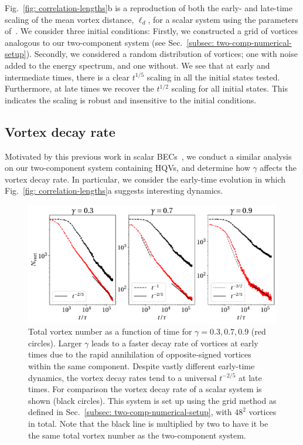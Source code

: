 Fig.~\ref{fig: correlation-lengths}b is a reproduction of both the early- and
late-time scaling of the mean vortex distance, \(\ell_d\), for a scalar system
using the parameters of~\cite{Karl2017}.
We consider three initial conditions: Firstly, we constructed a grid of vortices
analogous to our two-component system (see
Sec.~\ref{subsec: two-comp-numerical-setup}).
Secondly, we considered a random distribution of vortices; one with noise
added to the energy spectrum, and one without.
We see that at early and intermediate times, there is a clear \(t^{1/5}\)
scaling in all the initial states tested.
Furthermore, at late times we recover the \(t^{1/2}\) scaling for all initial
states.
This indicates the scaling is robust and insensitive to the initial conditions.

\subsection{Vortex decay rate}
Motivated by this previous work in scalar BECs~\cite{Karl2017}, we conduct a
similar analysis on our two-component system containing HQVs, and determine how
\(\gamma \) affects the vortex decay rate.
In particular, we consider the early-time evolution in which
Fig.~\ref{fig: correlation-lengths}a suggests interesting dynamics.
\begin{figure}
    \centering
    \includegraphics[width=\textwidth]{gfx/ch-twoCompDynamics/vortex_number.pdf}
    \caption[Vortex decay as a function of time for a system of HQVs for
    different \(\gamma \)]
    {\label{fig: vortex-number}Total vortex number as a function of time for
        \(\gamma=0.3,0.7,0.9\) (red circles).
        Larger \(\gamma \) leads to a faster decay rate of vortices at
        early times due to the rapid annihilation of opposite-signed vortices
        within the same component.
        Despite vastly different early-time dynamics, the vortex decay rates
        tend to a universal \(t^{-2/5}\) at late times.
        For comparison the vortex decay rate of a scalar system is shown
        (black circles).
        This system is set up using the grid method as defined in
        Sec.~\ref{subsec: two-comp-numerical-setup}, with \(48^2\) vortices in
        total.
        Note that the black line is multiplied by two to have it be the same
        total vortex number as the two-component system.
    }
\end{figure}
